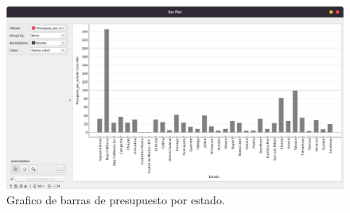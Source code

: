 \begin{enumerate}[I.]
\begin{figure}[h]
    \centering
    \includegraphics[width = 12 cm]{imagenes/grafica.jpeg}
    \caption{Grafico de barras de presupuesto por estado.}
    \label{diagrama}
\end{figure}


\end{enumerate}